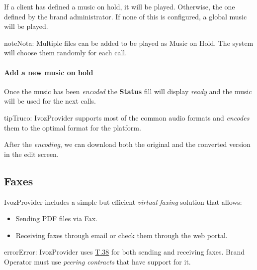 \documentclass[letterpaper,10pt,spanish]{sphinxmanual}
\begin{document}
If a client has defined a music on hold, it will be played. Otherwise, the
one defined by the brand administrator. If none of this is configured, a global
music will be played.

\begin{notice}{note}{Nota:}
Multiple files can be added to be played as Music on Hold. The system
will choose them randomly for each call.
\end{notice}
\paragraph{Add a new music on hold}

Once the music has been \emph{encoded} the \textbf{Status} fill will display \emph{ready} and
the music will be used for the next calls.

\begin{notice}{tip}{Truco:}
IvozProvider supports most of the common audio formats and \emph{encodes}
them to the optimal format for the platform.
\end{notice}

After the \emph{encoding}, we can download both the original and the converted
version in the edit screen.
\label{administration_portal/client/vpbx/faxes:faxing-system}

\subsection{Faxes}
\label{administration_portal/client/vpbx/faxes:faxes}\label{administration_portal/client/vpbx/faxes::doc}\label{administration_portal/client/vpbx/faxes:faxing-system}\label{administration_portal/client/vpbx/faxes:id1}
IvozProvider includes a simple but efficient \emph{virtual faxing} solution that allows:
\begin{itemize}
\item {} 
Sending PDF files via Fax.

\item {} 
Receiving faxes through email or check them through the web portal.

\end{itemize}

\begin{notice}{error}{Error:}
IvozProvider uses
\href{http://www.voip-info.org/wiki/view/T.38}{T.38} for both sending and receiving
faxes. Brand Operator must use \emph{peering contracts} that have support for it.
\end{notice}
\end{document}
